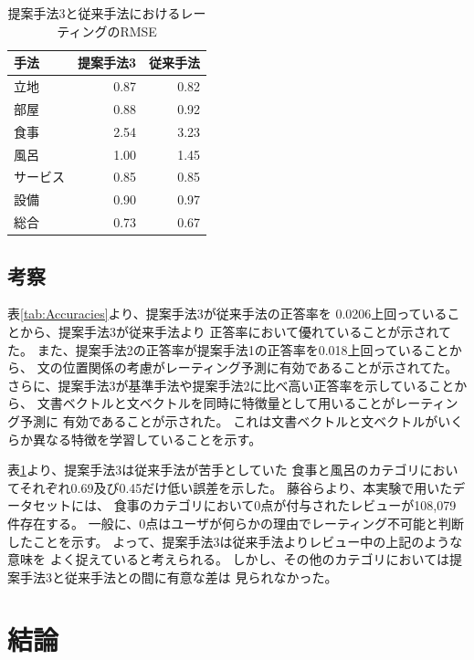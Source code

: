 \documentclass[twocolumn,a4paper]{ltjarticle}
\begin{document}
\begin{table}
  \caption{提案手法3と従来手法\cite{fujitani15}におけるレーティングのRMSE}
  \centering
  \begin{tabular}{l | r r} \label{tab:RMSEs}
    手法 & 提案手法3 & 従来手法\cite{fujitani15} \\
    \hline
    立地      & 0.87 & 0.82 \\
    部屋      & 0.88 & 0.92 \\
    食事      & 2.54 & 3.23 \\
    風呂      & 1.00 & 1.45 \\
    サービス  & 0.85 & 0.85 \\
    設備      & 0.90 & 0.97 \\
    総合      & 0.73 & 0.67 \\
  \end{tabular}
\end{table}


\subsection{考察}

表\ref{tab:Accuracies}より、提案手法3が従来手法\cite{fujitani15}の正答率を
0.0206上回っていることから、提案手法3が従来手法\cite{fujitani15}より
正答率において優れていることが示されてた。
また、提案手法2の正答率が提案手法1の正答率を0.018上回っていることから、
文の位置関係の考慮がレーティング予測に有効であることが示されてた。
さらに、提案手法3が基準手法や提案手法2に比べ高い正答率を示していることから、
文書ベクトルと文ベクトルを同時に特徴量として用いることがレーティング予測に
有効であることが示された。
これは文書ベクトルと文ベクトルがいくらか異なる特徴を学習していることを示す。

表\ref{tab:RMSEs}より、提案手法3は従来手法\cite{fujitani15}が苦手としていた
食事と風呂のカテゴリにおいてそれぞれ0.69及び0.45だけ低い誤差を示した。
藤谷ら\cite{fujitani15}より、本実験で用いたデータセットには、
食事のカテゴリにおいて0点が付与されたレビューが108,079件存在する。
一般に、0点はユーザが何らかの理由でレーティング不可能と判断したことを示す。
よって、提案手法3は従来手法\cite{fujitani15}よりレビュー中の上記のような意味を
よく捉えていると考えられる。
しかし、その他のカテゴリにおいては提案手法3と従来手法との間に有意な差は
見られなかった。


\section{結論}
\end{document}
